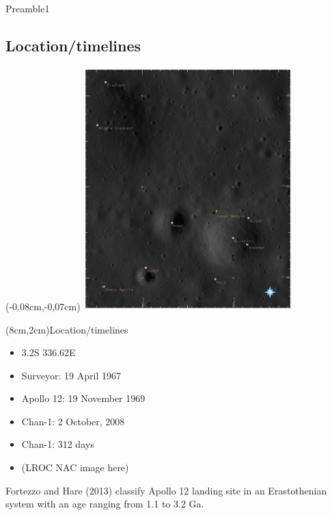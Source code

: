 \documentclass[aspectratio=169,unknownkeysallowed,xcolor=dvipsnames,beamer]{beamer} %
\begin{document}
\begin{frame}[fragile]{Preamble1}
\subsection{Location/timelines}
\begin{multicols}{2}
\begin{textblock*}{5cm}(-0.08cm,-0,07cm) %
\includegraphics[width=8.08cm]{images/fig1}
\end{textblock*}
\begin{textblock*}{7cm}(8cm,2cm){Location/timelines}
\scriptsize
\begin{itemize}
\item 3.2S 336.62E
\item Surveyor: 19 April 1967
\item Apollo 12: 19 November 1969
\item Chan-1: 2 October, 2008
\item Chan-1: 312 days
\item (LROC NAC image here)
\end{itemize}
\vspace{5mm}
Fortezzo and Hare (2013) classify Apollo 12 landing site in an Erastothenian system with an age ranging from 1.1 to 3.2 Ga.
\end{textblock*}
\end{multicols}
\end{frame}
\end{document}
